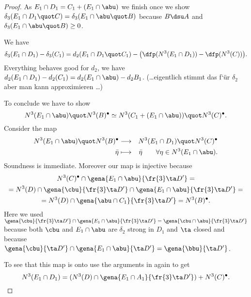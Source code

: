 \begin{proof}
As $E_{1}\cap D_{1}=C_{1}+(E_{1}\cap \abu)$ we finish once we show
$\delta_{3}(E_{1}\cap D_{1}\quot C)=\delta_{3}(E_{1}\cap\abu\quot B)$ because
$B\dsu A$ and $\delta_{3}(E_{1}\cap \abu\quot B)\geq 0$.

We have
$$\delta_{3}(E_{1}\cap D_{1})-\delta_{3}(C_{1})=
d_{2}(E_{1}\cap D_{1}\quot C_{1})
-\big(\dfp(N^{3}(E_{1}\cap D_{1}))-\dfp(N^{3}(C))\big).$$
Everything behaves good for $d_{2}$, we have $d_{2}(E_{1}\cap D_{1})-d_{2}(C_{1})=
d_{2}(E_{1}\cap\abu)-d_{2}B_{1}$. (\dots eigentlich stimmt das f`\"ur $\delta_{2}$ aber
man kann approximieren \dots)

To conclude we have to show
$$N^{3}(E_{1}\cap\abu)\quot N^{3}(B)^{\bullet}\simeq
N^{3}(C_{1}+(E_{1}\cap \abu))\quot N^{3}(C)^{\bullet}.$$
Consider the map
\begin{eqnarray*}
N^{3}(E_{1}\cap \abu)\quot N^{3}(B)^{\bullet}&\longrightarrow&N^{3}(E_{1}\cap D_{1})\quot N^{3}(C)^{\bullet}\\
\bar\eta&\longmapsto&\bar\eta\quad\quad\forall\eta\in N^{3}(E_{1}\cap\abu).
\end{eqnarray*}
Soundness is immediate. Moreover our map is injective because
\begin{multline*}
N^{3}(C)^{\bullet}\cap\gena{E_{1}\cap \abu}{\fr{3}\ta D^{\prime}}=\\
=N^{3}(D)\cap\gena{\cbu}{\fr{3}\ta D^{\prime}}\cap\gena{E_{1}\cap \abu}{\fr{3}\ta D^{\prime}}=\\
=N^{3}(D)\cap\gena{\abu\cap C_{1}}{\fr{3}\ta D^{\prime}}=N^{3}(B)^{\bullet}.
\end{multline*}
Here we used $\gena{\cbu}{\fr{3}\ta D^{\prime}}\cap\gena{E_{1}\cap\abu}{\fr{3}\ta D^{\prime}}=
\gena{\cbu\cap\abu}{\fr{3}\ta D^{\prime}}$ because both $\cbu$ and $E_{1}\cap\abu$ are $\delta_{2}$ strong in $D_{1}$ and $\ta$ closed and because $\gena{\cbu}{\ta D^{\prime}}\cap\gena{E_{1}\cap\abu}{\ta D^{\prime}}=\gena{\bbu}{\ta D^{\prime}}$.

To see that this map is onto use the arguments in  again to get
$$N^{3}(E_{1}\cap D_{1})=(
N^{3}(D)\cap\gena{E_{1}\cap A_{1}}{\fr{3}\ta D^{\prime}})+N^{3}(C)^{\bullet}.$$


\end{proof}
